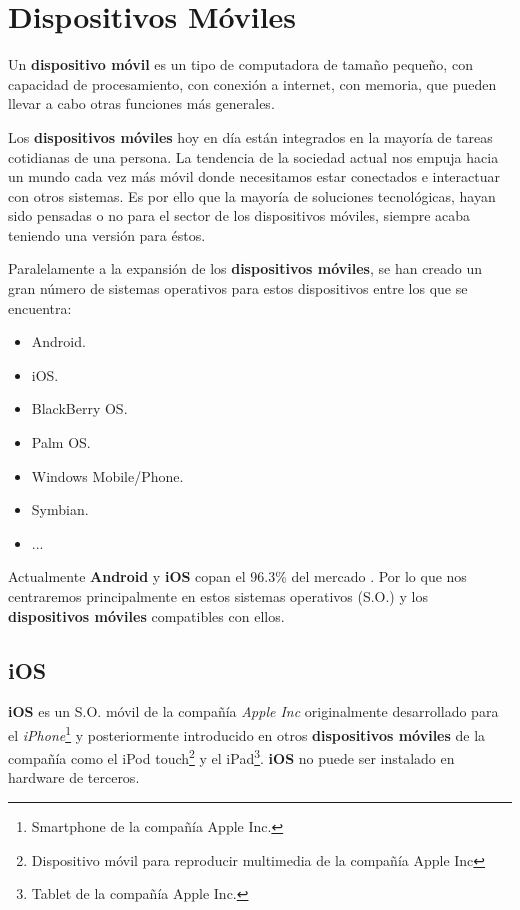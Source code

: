 \newpage

\section{Dispositivos Móviles}

Un \textbf{dispositivo móvil} es un tipo de computadora de tamaño pequeño, con capacidad de procesamiento, con conexión a internet, con memoria, que pueden llevar a cabo otras funciones más generales.

\bigskip
Los \textbf{dispositivos móviles} hoy en día están integrados en la mayoría de tareas cotidianas de una persona. La tendencia de la sociedad actual nos empuja hacia un mundo cada vez más móvil donde necesitamos estar conectados e interactuar con otros sistemas. Es por ello que la mayoría de soluciones tecnológicas, hayan sido pensadas o no para el sector de los dispositivos móviles, siempre acaba teniendo una versión para éstos.

\bigskip
Paralelamente a la expansión de los \textbf{dispositivos móviles}, se han creado un gran número de sistemas operativos para estos dispositivos entre los que se encuentra:

\begin{itemize}
  \item Android.
  \item iOS.
  \item BlackBerry OS.
  \item Palm OS.
  \item Windows Mobile/Phone.
  \item Symbian.
  \item ...
\end{itemize}

\bigskip
Actualmente \textbf{Android} y \textbf{iOS} copan el 96.3\% del mercado \cite{IDZATF} . Por lo que nos centraremos principalmente en estos sistemas operativos (S.O.) y los \textbf{dispositivos móviles} compatibles con ellos.

\subsection{iOS}

\textbf{iOS} es un S.O. móvil de la compañía \textit{Apple Inc} originalmente desarrollado para el \textit{iPhone}\footnote{Smartphone de la compañía Apple Inc.} y posteriormente introducido en otros \textbf{dispositivos móviles} de la compañía como el iPod touch\footnote{Dispositivo móvil para reproducir multimedia de la compañía Apple Inc} y el iPad\footnote{Tablet de la compañía Apple Inc.}. \textbf{iOS} no puede ser instalado en hardware de terceros.

